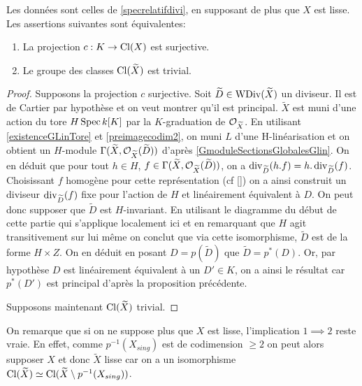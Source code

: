 \begin{thm}\label{clgtrivial}
Les données sont celles de \ref{specrelatifdivi}, en supposant de plus que $X$ est lisse. Les assertions suivantes sont équivalentes:
\begin{enumerate}
\item La projection $c:K\rightarrow \operatorname{Cl}(X)$ est surjective.
\item Le groupe des classes $\operatorname{Cl}(\widetilde{X})$ est trivial.
\end{enumerate}
\end{thm}
\begin{proof}
Supposons la projection $c$ surjective. Soit $\widetilde{D}\in \operatorname{WDiv}(\widetilde{X})$ un diviseur. Il est de Cartier par hypothèse et on veut montrer qu'il est principal. $\widetilde{X}$ est muni d'une action du tore $H\operatorname{Spec} k[K]$ par la $K$-graduation de $\mathcal{O}_{\widetilde{X}}$. En utilisant \ref{existenceGLinTore} et \ref{preimagecodim2},  on muni $L$ d'une H-linéarisation et on obtient un $H$-module $\Gamma(\widetilde{X}, \mathcal{O}_{\widetilde{X}}(\widetilde{D}))$ d'après \ref{GmoduleSectionsGlobalesGlin}. On en déduit que pour tout $h\in H$, $f\in \Gamma(\widetilde{X}, \mathcal{O}_{\widetilde{X}}(\widetilde{D}))$, on a $\operatorname{div}_{\widetilde{D}}(h.f)=h.\operatorname{div}_{\widetilde{D}}(f)$. Choisissant $f$ homogène pour cette représentation (cf \ref{}) on a ainsi construit un diviseur $\operatorname{div}_{\widetilde{D}}(f)$ fixe pour l'action de $H$ et linéairement équivalent à $D$. On peut donc supposer que $\widetilde{D}$ est $H$-invariant. En utilisant le diagramme du début de cette partie qui s'applique localement ici et en remarquant que $H$ agit transitivement sur lui même on conclut que via cette isomorphisme, $\widetilde{D}$ est de la forme $H\times Z$. On en déduit en posant $D=p(\widetilde{D})$ que $\widetilde{D}=p^*(D)$. Or, par hypothèse $D$ est linéairement équivalent à un $D'\in K$, on a ainsi le résultat car $p^*(D')$ est principal d'après la proposition précédente.

Supposons maintenant $\operatorname{Cl}(\widetilde{X})$ trivial.
\end{proof}

On remarque que si on ne suppose plus que $X$ est lisse, l'implication $1\implies 2$ reste vraie. En effet, comme $p^{-1}(X_{sing})$ est de codimension $\geq 2$ on peut alors supposer $X$ et donc $\widetilde{X}$ lisse car on a un isomorphisme $\operatorname{Cl}(\widetilde{X})\simeq\operatorname{Cl}(\widetilde{X}\setminus p^{-1}(X_{sing}))$.

